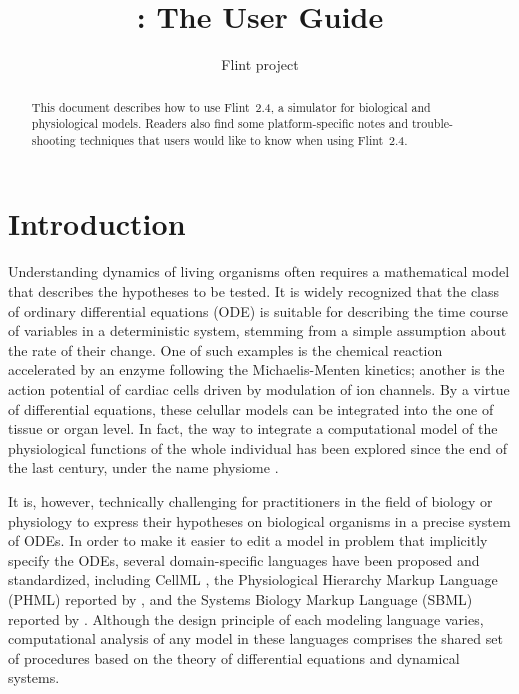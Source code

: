 \documentclass[a4paper,10pt]{report}
\title{\Flint: The User Guide}
\author{Flint project}
\def\FlintVersion{2.4}
\def\Flint{Flint~\FlintVersion}
\def\Tagline{a simulator for biological and physiological models}
\begin{document}
\maketitle

\begin{abstract}
This document describes how to use \Flint, \Tagline.
Readers also find some platform-specific notes and trouble-shooting techniques that
users would like to know when using \Flint.
\end{abstract}

\tableofcontents

\vfill

\doclicenseThis


\chapter{Introduction}

Understanding dynamics of living organisms often requires a mathematical model
that describes the hypotheses to be tested. It is widely recognized that the
class of ordinary differential equations (ODE) is suitable for describing the
time course of variables in a deterministic system, stemming from a simple
assumption about the rate of their change.
One of such examples is the chemical reaction accelerated by an enzyme
following the Michaelis-Menten kinetics; another is the action potential of
cardiac cells driven by modulation of ion channels. By a virtue of
differential equations, these celullar models can be integrated into the one of
tissue or organ level. In fact, the way to integrate a computational model of
the physiological functions of the whole individual has been explored since the
end of the last century, under the name physiome \cite{leem_perspectives_2016}.

It is, however, technically challenging for practitioners in the field of
biology or physiology to express their hypotheses on biological organisms in a
precise system of ODEs. In order to make it easier to edit a model in problem
that implicitly specify the ODEs, several domain-specific languages have
been proposed and standardized, including CellML \cite{CellML}, the
Physiological Hierarchy Markup Language (PHML) reported by
\cite{PHML}, and the Systems Biology Markup Language (SBML) reported
by \cite{SBML}. Although the design principle of each modeling
language varies, computational analysis of any model in these languages
comprises the shared set of procedures based on the theory of differential
equations and dynamical systems.
\end{document}
